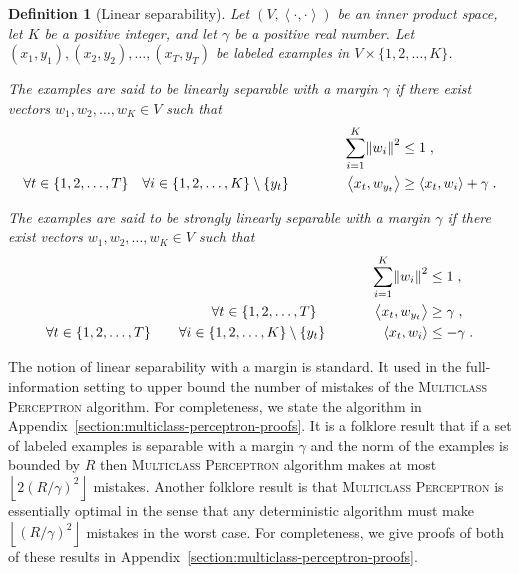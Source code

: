 \documentclass[12pt]{article}
\newtheorem{definition}{Definition}
\newcommand{\ip}[2]{\left\langle #1, #2 \right\rangle} %
\begin{document}
\begin{definition}[Linear separability]
Let $(V,\ip{\cdot}{\cdot})$ be an inner product space, let $K$ be a positive
integer, and let $\gamma$ be a positive real number. Let $(x_1, y_1), (x_2,
y_2), \dots, (x_T, y_T)$ be labeled examples in $V \times \{1,2,\dots,K\}$.

The examples are said to be \emph{linearly separable with a
margin $\gamma$} if there exist vectors $w_1, w_2, \dots, w_K \in V$ such
that
\begin{align}
\label{equation:linear-separability-1}
\sum_{i=1}^K \norm{w_i}^2 & \le 1 \; , \\
\label{equation:linear-separability-2}
\forall t \in \{1,2,\dots,T\} \quad \forall i \in \{1,2,\dots, K\} \setminus \{y_t\} \qquad \qquad \ip{x_t}{w_{y_t}} & \ge \ip{x_t}{w_i} + \gamma \; .
\end{align}

The examples are said to be \emph{strongly linearly separable with a
margin $\gamma$} if there exist vectors $w_1, w_2, \dots, w_K \in V$ such
that
\begin{align}
\label{equation:strong-linear-separability-1}
\sum_{i=1}^K \norm{w_i}^2 & \le 1 \; , \\
\label{equation:strong-linear-separability-2}
\forall t \in \{1,2,\dots,T\} \qquad \qquad \ip{x_t}{w_{y_t}} &\ge \gamma \; , \\
\label{equation:strong-linear-separability-3}
\forall t \in \{1,2,\dots,T\} \qquad \forall i \in \{1,2,\dots, K\} \setminus \{y_t\} \qquad \qquad \ip{x_t}{w_i} & \le - \gamma \; .
\end{align}
\end{definition}

The notion of linear separability with a margin is standard. It used in the
full-information setting to upper bound the number of mistakes of the
\textsc{Multiclass Perceptron} algorithm. For completeness, we state the
algorithm in Appendix~\ref{section:multiclass-perceptron-proofs}. It is a
folklore result that if a set of labeled examples is separable with a margin
$\gamma$ and the norm of the examples is bounded by $R$ then \textsc{Multiclass
Perceptron} algorithm makes at most $\left\lfloor 2(R/\gamma)^2 \right \rfloor$
mistakes. Another folklore result is that \textsc{Multiclass Perceptron} is
essentially optimal in the sense that any deterministic algorithm must make
$\left\lfloor (R/\gamma)^2 \right \rfloor$ mistakes in the worst case. For
completeness, we give proofs of both of these results in
Appendix~\ref{section:multiclass-perceptron-proofs}.
\end{document}
